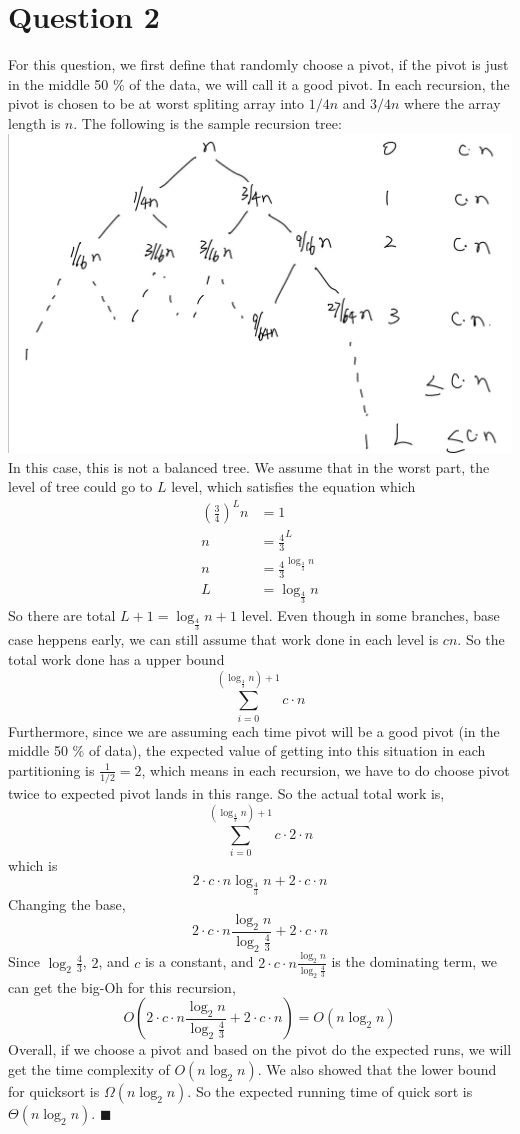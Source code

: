 \documentclass{article}
\begin{document}
\section*{Question 2}
For this question, we first define that randomly choose a pivot, if the pivot is just in the middle 50 \% of the data, we will call it a good pivot. In each recursion, 
the pivot is chosen to be at worst spliting array into $1/4n$ and $3/4n$ where the array length is $n$. The following is the sample recursion tree:
\includegraphics[scale=0.25]{tree2.jpg}\\
In this case, this is not a balanced tree. We assume that in the worst part, the level of tree could
go to $L$ level, which satisfies the equation which 
\begin{align}
    (\frac{3}{4})^L n &= 1 \nonumber \\
    n &= \frac{4}{3}^L \nonumber \\
    n &= \frac{4}{3}^{\log_{\frac{4}{3}}n} \nonumber \\
    L &= \log_{\frac{4}{3}}n \nonumber
\end{align}
So there are total $L+1 = \log_{\frac{4}{3}}n +1$ level. Even though in some branches, base case heppens early, we can still assume that work done in each level
is $cn$. So the total work done has a upper bound
$$\sum_{i=0}^{(\log_\frac{4}{3}n) + 1}  c\cdot n$$
Furthermore, since we are assuming each time pivot will be a good pivot (in the middle 50 \% of data), the expected value of getting into this situation
in each partitioning is $\frac{1}{1/2} = 2$, which means in each recursion, we have to do choose pivot twice to expected pivot lands in this range. So the actual total work is,
$$\sum_{i=0}^{(\log_\frac{4}{3}n) + 1}  c \cdot 2\cdot n$$
which is 
$$ 2\cdot c\cdot n \log_{\frac{4}{3}}n + 2\cdot  c\cdot n$$
Changing the base,
$$2 \cdot c\cdot n \frac{\log_2n}{\log_2\frac{4}{3}} + 2\cdot c\cdot n$$
Since $\log_2\frac{4}{3}$, $2$, and $c$ is a constant, and $2\cdot c\cdot n \frac{\log_2n}{\log_2\frac{4}{3}}$ is the dominating term, we can get the big-Oh for this recursion,
$$O(2 \cdot c\cdot n \frac{\log_2n}{\log_2\frac{4}{3}} + 2\cdot  c\cdot n) = O(n\log_2n)$$
Overall, if we choose a pivot and based on the pivot do the expected runs, we will get the time complexity of $O(n\log_2 n)$. We also showed that the lower bound for quicksort 
is $\Omega(n\log_2 n)$. So the expected running time of quick sort is $\Theta(n\log_2 n)$. $\blacksquare$
\end{document}

